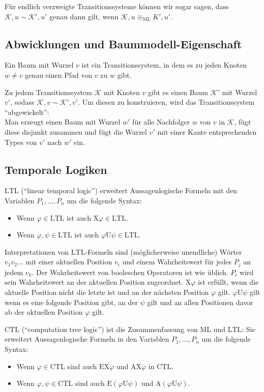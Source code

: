 \documentclass[a4paper,parskip=half*,DIV=15,fontsize=11pt]{scrartcl}
\newcommand{\K}{\mathcal{K}}
\newcommand{\ML}{\mathrm{ML}}
\newcommand{\LTL}{\mathrm{LTL}}
\newcommand{\CTL}{\mathrm{CTL}}
\newcommand{\X}{\mathrm{X}}
\newcommand{\until}{\mathrm{U}}
\begin{document}
Für endlich verzweigte Transitionssysteme können wir sogar sagen, dass $\K, u \sim \K', u'$ genau dann gilt, wenn $\K, u \equiv_\ML K', u'$.

\subsection{Abwicklungen und Baummodell-Eigenschaft}

Ein Baum mit Wurzel $v$ ist ein Transitionssystem, in dem es zu jeden Knoten $w \ne v$ genau einen Pfad von $v$ zu $w$ gibt.

Zu jedem Transitionssystem $\K$ mit Knoten $v$ gibt es einen Baum $\K'$ mit Wurzel $v'$, sodass $\K, v \sim \K', v'$. Um diesen zu konstruieren, wird das Transitionssystem ``abgewickelt'':    \\
Man erzeugt einen Baum mit Wurzel $w'$ für alle Nachfolger $w$ von $v$ in $\K$, fügt diese disjunkt zusammen und fügt die Wurzel $v'$ mit einer Kante entsprechenden Types von $v'$ nach $w'$ ein.

\subsection{Temporale Logiken}

$\LTL$ (``linear temporal logic'') erweitert Aussagenlogische Formeln mit den Variablen $P_1,\ldots,P_n$ um die folgende Syntax:
\begin{itemize}
\item Wenn $\varphi \in \LTL$ ist auch $\X\varphi \in \LTL$.
\item Wenn $\varphi, \psi \in \LTL$ ist auch $\varphi \until \psi \in \LTL$.
\end{itemize}

Interpretationen von $\LTL$-Formeln sind (möglicherweise unendliche) Wörter $v_1v_2\ldots$ mit einer aktuellen Position $v_i$ und einem Wahrheitswert für jedes $P_j$ an jedem $v_k$. Der Wahrheitswert von booleschen Operatoren ist wie üblich. $P_i$ wird sein Wahrheitswert an der aktuellen Position zugeordnet. $\X\varphi$ ist erfüllt, wenn die aktuelle Position nicht die letzte ist und an der nächsten Position $\varphi$ gilt. $\varphi\until\psi$ gilt wenn es eine folgende Position gibt, an der $\psi$ gilt und an allen Positionen davor ab der aktuellen Position $\varphi$ gilt.

$\CTL$ (``computation tree logic'') ist die Zusammenfassung von $\ML$ und $\LTL$: Sie erweitert Aussagenlogische Formeln in den Variablen $P_1,\ldots,P_n$ um die folgende Syntax:
\begin{itemize}
\item Wenn $\varphi \in \CTL$ sind auch $\mathrm{E}\X\varphi$ und $\mathrm{A}\X\varphi$ in $\CTL$.
\item Wenn $\varphi, \psi \in \CTL$ sind auch $\mathrm{E}(\varphi \until \psi)$ und $\mathrm{A}(\varphi\until\psi)$.
\end{itemize}
\end{document}
